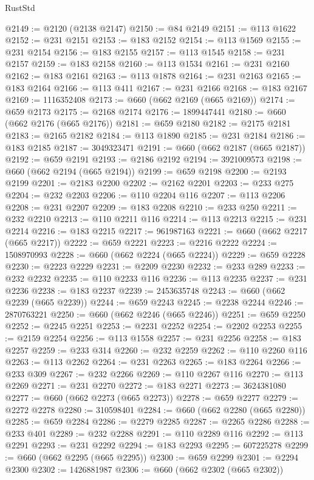 \begin{lexlean}{RustStd}
\begin{coremodule}
@2149 := @2120 (@2138 @2147)
@2150 := @84 @2149
@2151 := @113 @1622
@2152 := @231 @2151
@2153 := @183 @2152
@2154 := @113 @1569
@2155 := @231 @2154
@2156 := @183 @2155
@2157 := @113 @1545
@2158 := @231 @2157
@2159 := @183 @2158
@2160 := @113 @1534
@2161 := @231 @2160
@2162 := @183 @2161
@2163 := @113 @1878
@2164 := @231 @2163
@2165 := @183 @2164
@2166 := @113 @411
@2167 := @231 @2166
@2168 := @183 @2167
@2169 := 1116352408
@2173 := @660 (@662 @2169 (@665 @2169))
@2174 := @659 @2173
@2175 := @2168 @2174
@2176 := 1899447441
@2180 := @660 (@662 @2176 (@665 @2176))
@2181 := @659 @2180
@2182 := @2175 @2181
@2183 := @2165 @2182
@2184 := @113 @1890
@2185 := @231 @2184
@2186 := @183 @2185
@2187 := 3049323471
@2191 := @660 (@662 @2187 (@665 @2187))
@2192 := @659 @2191
@2193 := @2186 @2192
@2194 := 3921009573
@2198 := @660 (@662 @2194 (@665 @2194))
@2199 := @659 @2198
@2200 := @2193 @2199
@2201 := @2183 @2200
@2202 := @2162 @2201
@2203 := @233 @275
@2204 := @232 @2203
@2206 := @110 @2204 @116
@2207 := @113 @2206
@2208 := @231 @2207
@2209 := @183 @2208
@2210 := @233 @250
@2211 := @232 @2210
@2213 := @110 @2211 @116
@2214 := @113 @2213
@2215 := @231 @2214
@2216 := @183 @2215
@2217 := 961987163
@2221 := @660 (@662 @2217 (@665 @2217))
@2222 := @659 @2221
@2223 := @2216 @2222
@2224 := 1508970993
@2228 := @660 (@662 @2224 (@665 @2224))
@2229 := @659 @2228
@2230 := @2223 @2229
@2231 := @2209 @2230
@2232 := @233 @289
@2233 := @232 @2232
@2235 := @110 @2233 @116
@2236 := @113 @2235
@2237 := @231 @2236
@2238 := @183 @2237
@2239 := 2453635748
@2243 := @660 (@662 @2239 (@665 @2239))
@2244 := @659 @2243
@2245 := @2238 @2244
@2246 := 2870763221
@2250 := @660 (@662 @2246 (@665 @2246))
@2251 := @659 @2250
@2252 := @2245 @2251
@2253 := @2231 @2252
@2254 := @2202 @2253
@2255 := @2159 @2254
@2256 := @113 @1558
@2257 := @231 @2256
@2258 := @183 @2257
@2259 := @233 @314
@2260 := @232 @2259
@2262 := @110 @2260 @116
@2263 := @113 @2262
@2264 := @231 @2263
@2265 := @183 @2264
@2266 := @233 @309
@2267 := @232 @2266
@2269 := @110 @2267 @116
@2270 := @113 @2269
@2271 := @231 @2270
@2272 := @183 @2271
@2273 := 3624381080
@2277 := @660 (@662 @2273 (@665 @2273))
@2278 := @659 @2277
@2279 := @2272 @2278
@2280 := 310598401
@2284 := @660 (@662 @2280 (@665 @2280))
@2285 := @659 @2284
@2286 := @2279 @2285
@2287 := @2265 @2286
@2288 := @233 @401
@2289 := @232 @2288
@2291 := @110 @2289 @116
@2292 := @113 @2291
@2293 := @231 @2292
@2294 := @183 @2293
@2295 := 607225278
@2299 := @660 (@662 @2295 (@665 @2295))
@2300 := @659 @2299
@2301 := @2294 @2300
@2302 := 1426881987
@2306 := @660 (@662 @2302 (@665 @2302))

\end{coremodule}
\end{lexlean}

